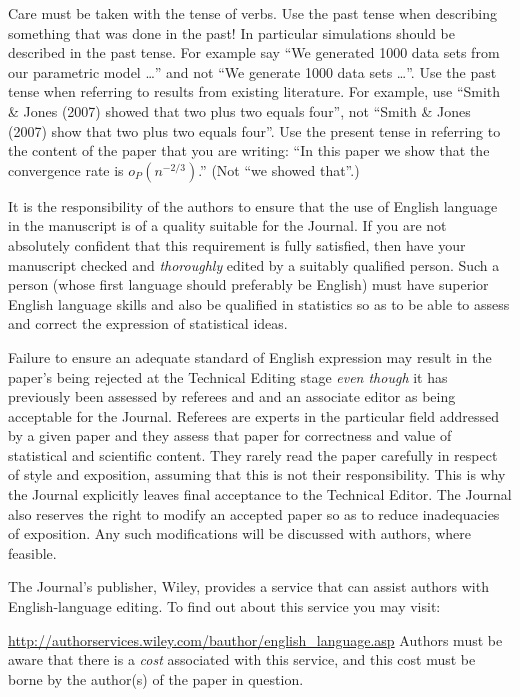 \documentclass[times, doublespace]{anzsauth}
\begin{document}
Care must be taken with the tense of verbs.  Use the past tense
when describing something that was done in the past! In particular
simulations should be described in the past tense.  For example say
``We generated 1000 data sets from our parametric model \ldots''
and not ``We generate 1000 data sets \ldots''.  Use the past tense
when referring to results from existing literature.  For example,
use ``Smith \& Jones (2007) showed that two plus two equals four'',
not ``Smith \& Jones (2007) show that two plus two equals four''.
Use the present tense in referring to the content of the paper that
you are writing: ``In this paper we show that the convergence rate
is $o_P(n^{-2/3})$.''  (Not ``we showed that''.)

It is the responsibility of the authors to ensure that the use
of English language in the manuscript is of a quality suitable
for the Journal. If you are not absolutely confident that this
requirement is fully satisfied, then have your manuscript checked
and \emph{thoroughly} edited by a suitably qualified person.
Such a person (whose first language should preferably be English)
must have superior English language skills and also be qualified
in statistics so as to be able to assess and correct the expression
of statistical ideas.

Failure to ensure an adequate standard of English expression may
result in the paper's being rejected at the Technical Editing stage
\emph{even though} it has previously been assessed by referees
and and an associate editor as being acceptable for the Journal.
Referees are experts in the particular field addressed by a given
paper and they assess that paper for correctness and value of
statistical and scientific content. They rarely read the paper
carefully in respect of style and exposition, assuming that this is
not their responsibility.  This is why the Journal explicitly leaves
final acceptance to the Technical Editor.  The Journal also reserves
the right to modify an accepted paper so as to reduce inadequacies of
exposition.  Any such modifications will be discussed with authors,
where feasible.

The Journal's publisher, Wiley, provides a service that can assist
authors with English-language editing.  To find out about this
service you may visit:

{\small
\url{http://authorservices.wiley.com/bauthor/english_language.asp}
}
\noindent
Authors must be aware that there is a \emph{cost} associated with
this service, and this cost must be borne by the author(s) of the
paper in question.
\end{document}
